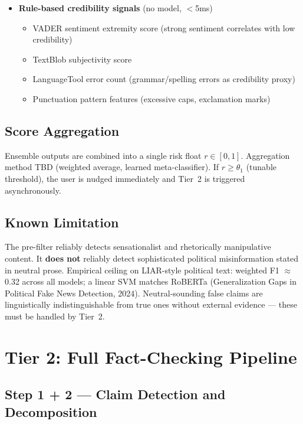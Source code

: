 \begin{itemize}
  \item \textbf{Rule-based credibility signals} (no model, $<$5ms)\\
    \begin{itemize}
      \item VADER sentiment extremity score (strong sentiment correlates with low credibility)
      \item TextBlob subjectivity score
      \item LanguageTool error count (grammar/spelling errors as credibility proxy)
      \item Punctuation pattern features (excessive caps, exclamation marks)
    \end{itemize}

\end{itemize}

\subsection{Score Aggregation}

Ensemble outputs are combined into a single risk float $r \in [0, 1]$.
Aggregation method TBD (weighted average, learned meta-classifier).
If $r \geq \theta_1$ (tunable threshold), the user is nudged immediately and Tier~2 is triggered asynchronously.

\subsection{Known Limitation}

The pre-filter reliably detects sensationalist and rhetorically manipulative content.
It \textbf{does not} reliably detect sophisticated political misinformation stated in neutral prose.
Empirical ceiling on LIAR-style political text: weighted F1 $\approx$ 0.32 across all models; a linear SVM matches RoBERTa (Generalization Gaps in Political Fake News Detection, 2024).
Neutral-sounding false claims are linguistically indistinguishable from true ones without external evidence --- these must be handled by Tier~2.

\section{Tier 2: Full Fact-Checking Pipeline}

\subsection{Step 1 + 2 --- Claim Detection and Decomposition}

